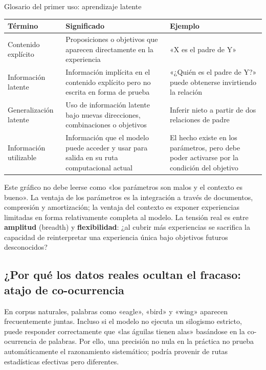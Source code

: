 \begin{knowledgebox}{Glosario del primer uso: aprendizaje latente}
\begin{tabularx}{\textwidth}{L{0.23\textwidth}X X}
\toprule
Término & Significado & Ejemplo \\
\midrule
Contenido explícito & Proposiciones o objetivos que aparecen directamente en la experiencia & «X es el padre de Y» \\
Información latente & Información implícita en el contenido explícito pero no escrita en forma de prueba & «¿Quién es el padre de Y?» puede obtenerse invirtiendo la relación \\
Generalización latente & Uso de información latente bajo nuevas direcciones, combinaciones o objetivos & Inferir nieto a partir de dos relaciones de padre \\
Información utilizable & Información que el modelo puede acceder y usar para salida en su ruta computacional actual & El hecho existe en los parámetros, pero debe poder activarse por la condición del objetivo \\
\bottomrule
\end{tabularx}
\end{knowledgebox}


Este gráfico no debe leerse como «los parámetros son malos y el contexto es bueno». La ventaja de los parámetros es la integración a través de documentos, compresión y amortización; la ventaja del contexto es exponer experiencias limitadas en forma relativamente completa al modelo. La tensión real es entre \textbf{amplitud} (breadth) y \textbf{flexibilidad}: ¿al cubrir más experiencias se sacrifica la capacidad de reinterpretar una experiencia única bajo objetivos futuros desconocidos?

\subsection{¿Por qué los datos reales ocultan el fracaso: atajo de co-ocurrencia}

En corpus naturales, palabras como «eagle», «bird» y «wing» aparecen frecuentemente juntas. Incluso si el modelo no ejecuta un silogismo estricto, puede responder correctamente que «las águilas tienen alas» basándose en la co-ocurrencia de palabras. Por ello, una precisión no nula en la práctica no prueba automáticamente el razonamiento sistemático; podría provenir de rutas estadísticas efectivas pero diferentes.

